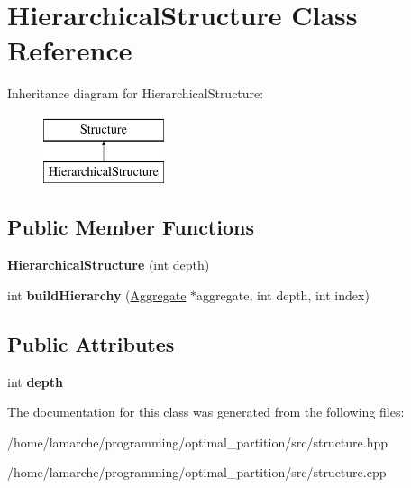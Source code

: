 \hypertarget{classHierarchicalStructure}{\section{Hierarchical\-Structure Class Reference}
\label{classHierarchicalStructure}
}
Inheritance diagram for Hierarchical\-Structure\-:\begin{figure}[H]
\begin{center}
\leavevmode
\includegraphics[height=2.000000cm]{classHierarchicalStructure}
\end{center}
\end{figure}
\subsection*{Public Member Functions}
\begin{DoxyCompactItemize}
\item 
\hypertarget{classHierarchicalStructure_af890848efff872a4da793f041a026c62}{{\bfseries Hierarchical\-Structure} (int depth)}\label{classHierarchicalStructure_af890848efff872a4da793f041a026c62}

\item 
\hypertarget{classHierarchicalStructure_a23422af4415e39de39e577ddd82ac4d9}{int {\bfseries build\-Hierarchy} (\hyperlink{classAggregate}{Aggregate} $\ast$aggregate, int depth, int index)}\label{classHierarchicalStructure_a23422af4415e39de39e577ddd82ac4d9}

\end{DoxyCompactItemize}
\subsection*{Public Attributes}
\begin{DoxyCompactItemize}
\item 
\hypertarget{classHierarchicalStructure_a8f6d2b5b65b1fda6257e6d25362ad766}{int {\bfseries depth}}\label{classHierarchicalStructure_a8f6d2b5b65b1fda6257e6d25362ad766}

\end{DoxyCompactItemize}


The documentation for this class was generated from the following files\-:\begin{DoxyCompactItemize}
\item 
/home/lamarche/programming/optimal\-\_\-partition/src/structure.\-hpp\item 
/home/lamarche/programming/optimal\-\_\-partition/src/structure.\-cpp\end{DoxyCompactItemize}
